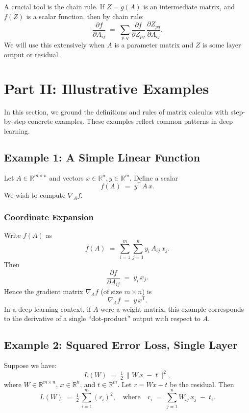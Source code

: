 \documentclass[11pt]{article}
\newcommand{\R}{\mathbb{R}}
\begin{document}
A crucial tool is the chain rule. 
If $Z = g(A)$ is an intermediate matrix, and $f(Z)$ is a scalar function, 
then by chain rule:
\[
\frac{\partial f}{\partial A_{ij}}
\;=\;
\sum_{p,q} \frac{\partial f}{\partial Z_{pq}} \,\frac{\partial Z_{pq}}{\partial A_{ij}}.
\]
We will use this extensively when $A$ is a parameter matrix and $Z$ is some layer output or residual.

\vspace{1cm}
\section{Part II: Illustrative Examples}
\label{sec:examples}

In this section, we ground the definitions and rules of matrix calculus 
with step-by-step concrete examples. 
These examples reflect common patterns in deep learning.

\subsection{Example 1: A Simple Linear Function}

Let $A \in \R^{m \times n}$ and vectors $x \in \R^n, y \in \R^m$. 
Define a scalar
\[
f(A) \;=\; y^\mathsf{T} \, A \, x.
\]
We wish to compute $\nabla_A f$. 

\subsubsection{Coordinate Expansion}
Write $f(A)$ as
\[
f(A) 
\;=\;
\sum_{i=1}^m \sum_{j=1}^n
y_i \, A_{ij} \, x_j.
\]
Then
\[
\frac{\partial f}{\partial A_{ij}}
\;=\;
y_i \, x_j.
\]
Hence the gradient matrix $\nabla_A f$ (of size $m \times n$) is 
\[
\nabla_A f 
\;=\;
y \, x^\mathsf{T}.
\]
In a deep-learning context, if $A$ were a weight matrix, 
this example corresponds to the derivative of a single “dot-product” output 
with respect to $A$. 

\subsection{Example 2: Squared Error Loss, Single Layer}
\label{sec:example-squared-loss}

Suppose we have:
\[
L(W) 
\;=\; 
\tfrac12 \, \bigl\| W\,x \;-\; t \bigr\|^2,
\]
where $W \in \R^{m \times n}$, $x \in \R^n$, and $t \in \R^m$.  
Let $r = W x - t$ be the residual.  
Then 
\[
L(W) \;=\; \tfrac12 \, \sum_{i=1}^m (r_i)^2,
\quad
\text{where}
\quad
r_i \;=\; \sum_{j=1}^n W_{ij}\, x_j \;-\; t_i.
\]
\end{document}
